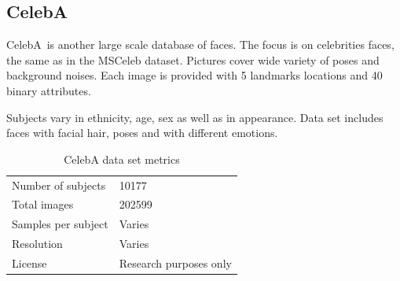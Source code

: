 \pagebreak
\subsection{CelebA}

CelebA\,\cite{celeba} is another large scale database of faces. The focus is on celebrities faces, the same as in the MSCeleb dataset. Pictures cover wide variety of poses and background noises. Each image is provided with 5 landmarks locations and 40 binary attributes.

Subjects vary in ethnicity, age, sex as well as in appearance. Data set includes faces with facial hair, poses and with different emotions.

\begin{table}[ht]
    \centering
    \begin{tabularx}{.8\textwidth}{l|X}
        \toprule
        Number of subjects & \num{10177} \\
        Total images & \num{202599} \\
        Samples per subject & Varies \\
        Resolution & Varies \\
        License & Research purposes only \\
        \bottomrule
    \end{tabularx}
    \caption{CelebA data set metrics}
\end{table}
